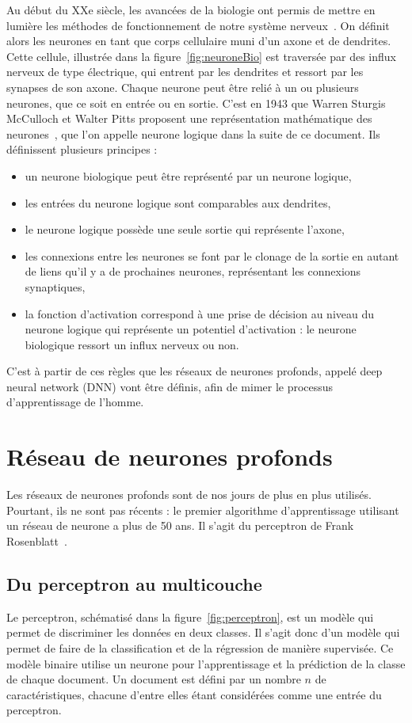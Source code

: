 
Au début du XXe siècle, les avancées de la biologie ont permis de mettre en lumière les méthodes de fonctionnement de notre système nerveux~\cite{Cajal1906}. On définit alors les neurones en tant que corps cellulaire muni d’un axone et de dendrites. Cette cellule, illustrée dans la figure~\ref{fig:neuroneBio} est traversée par des influx nerveux de type électrique, qui entrent par les dendrites et ressort par les synapses de son axone. Chaque neurone peut être relié à un ou plusieurs neurones, que ce soit en entrée ou en sortie.
C'est en 1943 que Warren Sturgis McCulloch et Walter Pitts proposent une représentation mathématique des neurones~\cite{McCulloch1943}, que l'on appelle neurone logique dans la suite de ce document. Ils définissent plusieurs principes :
\begin{itemize}
  \item un neurone biologique peut être représenté par un neurone logique,
  \item les entrées du neurone logique sont comparables aux dendrites,
  \item le neurone logique possède une seule sortie qui représente l'axone,
  \item les connexions entre les neurones se font par le clonage de la sortie en autant de liens qu'il y a de prochaines neurones, représentant les connexions synaptiques,
  \item la fonction d'activation correspond à une prise de décision au niveau du neurone logique qui représente un potentiel d'activation : le neurone biologique ressort un influx nerveux ou non.
\end{itemize}
C'est à partir de ces règles que les réseaux de neurones profonds, appelé deep neural network (DNN) vont être définis, afin de mimer le processus d'apprentissage de l'homme.

\section{Réseau de neurones profonds}
Les réseaux de neurones profonds sont de nos jours de plus en plus utilisés. Pourtant, ils ne sont pas récents : le premier algorithme d'apprentissage utilisant un réseau de neurone a plus de 50 ans. Il s'agit du perceptron de Frank Rosenblatt~\cite{Rosenblatt1957}.

\subsection{Du perceptron au multicouche}

Le perceptron, schématisé dans la figure~\ref{fig:perceptron}, est un modèle qui permet de discriminer les données en deux classes. Il s'agit donc d'un modèle qui permet de faire de la classification et de la régression de manière supervisée. Ce modèle binaire utilise un neurone pour l'apprentissage et la prédiction de la classe de chaque document. Un document est défini par un nombre $n$ de caractéristiques, chacune d'entre elles étant considérées comme une entrée du perceptron.

